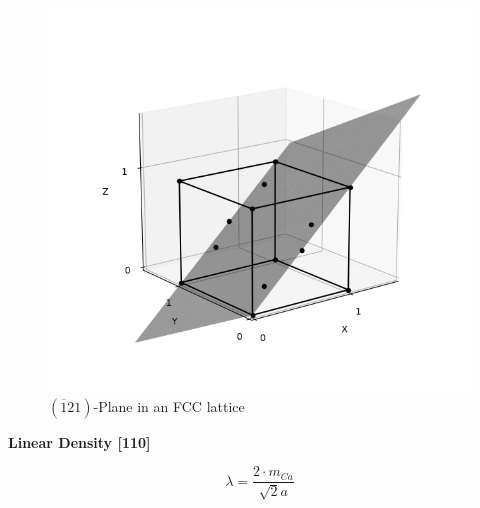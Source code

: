 \begin{figure}[H]
	\centering
	\includegraphics[width=0.6\linewidth]{Graphics/Chapter1/PLANE121}
	\caption{$(\overline{1}21)$-Plane in an FCC lattice}
	\label{}
\end{figure}


\textbf{Linear Density [110]}

$$\lambda = \frac{2 \cdot m_{Ca}}{\sqrt{2}a}$$
